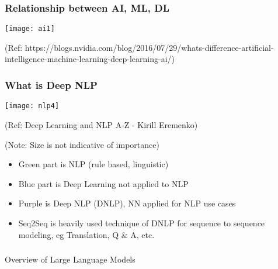 \begin{frame}[fragile]\frametitle{Relationship between AI, ML, DL}
\begin{center}
\texttt{[image: ai1]}
\end{center}
{\tiny (Ref: https://blogs.nvidia.com/blog/2016/07/29/whats-difference-artificial-intelligence-machine-learning-deep-learning-ai/)}
\end{frame}



\begin{frame}[fragile]\frametitle{What is Deep NLP}
\begin{center}
\texttt{[image: nlp4]}

\tiny{(Ref: Deep Learning and NLP A-Z - Kirill Eremenko)}

\tiny{(Note: Size is not indicative of importance)}
\end{center}

	\begin{itemize}
	\item Green part is NLP (rule based, linguistic)
	\item Blue part is Deep Learning not applied to NLP
	\item Purple is Deep NLP (DNLP), NN applied for NLP use cases
	\item Seq2Seq is heavily used technique of DNLP for sequence to sequence modeling, eg Translation, Q \& A, etc.
	\end{itemize}
	

\end{frame}


\begin{frame}[fragile]\frametitle{}
\begin{center}
{\Large Overview of Large Language Models}
\end{center}
\end{frame}



